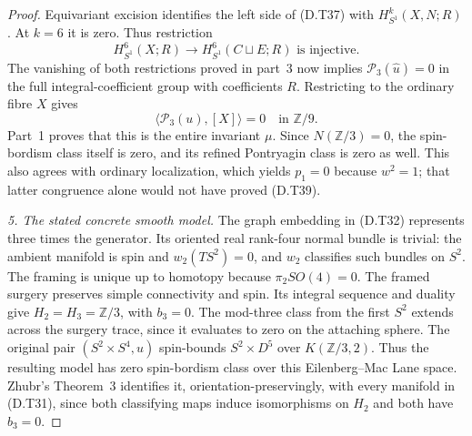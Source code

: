 \begin{proof}
Equivariant excision identifies the left side of (D.T37) with
$H^k_{S^1}(X,N;R)$. At $k=6$ it is zero. Thus restriction
\[
 H^6_{S^1}(X;R)\longrightarrow H^6_{S^1}(C\sqcup E;R)
                         \text{ is injective}.               \tag{D.T38}
\]
The vanishing of both restrictions proved in part~3 now implies
$\mathcal P_3(\widehat u)=0$ in the full integral-coefficient group
with coefficients $R$. Restricting to the ordinary fibre $X$ gives
\[
                        \langle\mathcal P_3(u),[X]\rangle=0
                                     \quad\text{in }\mathbb Z/9.
                                                               \tag{D.T39}
\]
Part~1 proves that this is the entire invariant $\mu$. Since
$N(\mathbb Z/3)=0$, the spin-bordism class itself is zero, and its
refined Pontryagin class is zero as well. This also agrees with
ordinary localization, which yields $p_1=0$ because $w^2=1$;
that latter congruence alone would not have proved (D.T39).

\emph{5. The stated concrete smooth model.}
The graph embedding in (D.T32) represents three times the generator.
Its oriented real rank-four normal bundle is trivial: the ambient
manifold is spin and $w_2(TS^2)=0$, and $w_2$ classifies such bundles
on $S^2$. The framing is unique up to homotopy because
$\pi_2SO(4)=0$. The framed surgery preserves simple connectivity
and spin. Its integral sequence and duality give
$H_2=H_3=\mathbb Z/3$, with $b_3=0$.
The mod-three class from the first $S^2$ extends across the surgery
trace, since it evaluates to zero on the attaching sphere.
The original pair $(S^2\times S^4,u)$ spin-bounds
$S^2\times D^5$ over $K(\mathbb Z/3,2)$.
Thus the resulting model has zero spin-bordism class over this
Eilenberg--Mac Lane space. Zhubr's Theorem~3
\cite[p.795]{manZhubr75} identifies it, orientation-preservingly,
with every manifold in (D.T31), since both classifying maps induce
isomorphisms on $H_2$ and both have $b_3=0$.
\end{proof}
